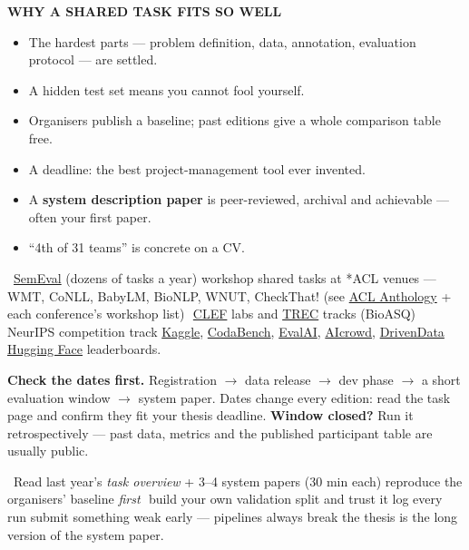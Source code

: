 \documentclass[10pt,a4paper]{article}
\newcommand{\head}[1]{%
  \vspace{4.5pt}{\color{brand}\rule{\linewidth}{0.9pt}}\par\vspace{1.5pt}%
  {\bfseries\color{brand}\MakeUppercase{#1}}\par\vspace{2pt}}
\newcommand{\sub}[1]{\par\addvspace{2.6pt}\noindent{\bfseries\color{ink}#1}\ \ignorespaces}
\newcommand{\lnk}[2]{\href{#1}{\color{brandlight}#2}}
\newcommand{\dt}{\,\textperiodcentered\,\allowbreak}
\newenvironment{flag}
 {\par\addvspace{2pt}\setlength{\FrameSep}{3pt}%
  \def\FrameCommand{{\color{accent}\vrule width 1.4pt}\hspace{4pt}}%
  \MakeFramed{\advance\hsize-\width \FrameRestore}\parindent=0pt\ignorespaces}
 {\par\endMakeFramed\addvspace{2pt}}
\begin{document}
\begin{multicols}{3}
\head{Why a shared task fits so well}
\begin{itemize}
  \item The hardest parts --- problem definition, data, annotation, evaluation
        protocol --- are settled.
  \item A hidden test set means you cannot fool yourself.
  \item Organisers publish a baseline; past editions give a whole comparison
        table free.
  \item A deadline: the best project-management tool ever invented.
  \item A \textbf{system description paper} is peer-reviewed, archival and
        achievable --- often your first paper.
  \item ``4th of 31 teams'' is concrete on a CV.
\end{itemize}
\sub{Where to find them}\lnk{https://semeval.github.io}{SemEval} (dozens of
tasks a year)\dt workshop shared tasks at *ACL venues --- WMT, CoNLL, BabyLM,
BioNLP, WNUT, CheckThat! (see \lnk{https://aclanthology.org}{ACL Anthology} +
each conference's workshop list)\dt
\lnk{https://www.clef-initiative.eu}{CLEF} labs and
\lnk{https://trec.nist.gov}{TREC} tracks (BioASQ)\dt NeurIPS competition
track\dt \lnk{https://www.kaggle.com}{Kaggle},
\lnk{https://www.codabench.org}{CodaBench},
\lnk{https://eval.ai}{EvalAI}, \lnk{https://www.aicrowd.com}{AIcrowd},
\lnk{https://www.drivendata.org}{DrivenData}\dt
\lnk{https://huggingface.co}{Hugging Face} leaderboards.
\begin{flag}
\textbf{Check the dates first.} Registration $\to$ data release $\to$ dev phase
$\to$ a short evaluation window $\to$ system paper. Dates change every edition:
read the task page and confirm they fit your thesis deadline.
\textbf{Window closed?} Run it retrospectively --- past data, metrics and the
published participant table are usually public.
\end{flag}
\sub{Running it as a thesis}Read last year's \emph{task overview} + 3--4 system
papers (30 min each)\dt reproduce the organisers' baseline \emph{first}\dt
build your own validation split and trust it\dt log every run\dt submit
something weak early --- pipelines always break\dt the thesis is the long
version of the system paper.


\end{multicols}
\end{document}
